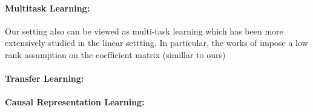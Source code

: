 \paragraph*{Multitask Learning:}
Our setting also can be viewed as multi-task learning which has been more extensively studied in the linear settting. In particular, the works of \citep{boursier2022trace} impose a low rank assumption on the coefficient matrix (simillar to ours)

\paragraph*{Transfer Learning:}

\paragraph*{Causal Representation Learning:}